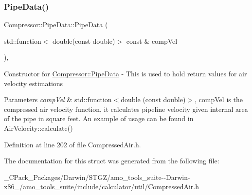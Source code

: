 \mbox{\label{struct_compressor_1_1_pipe_data_af7998fd533340b0a84e78fcda91b4806}} 
\subsubsection{\texorpdfstring{Pipe\+Data()}{PipeData()}\hspace{0.1cm}{\footnotesize\ttfamily [6/6]}}
{\footnotesize\ttfamily Compressor\+::\+Pipe\+Data\+::\+Pipe\+Data (\begin{DoxyParamCaption}\item[{std\+::function$<$ double(const double)$>$ const \&}]{comp\+Vel }\end{DoxyParamCaption})\hspace{0.3cm}{\ttfamily [inline]}, {\ttfamily [explicit]}}

Constructor for \hyperlink{struct_compressor_1_1_pipe_data}{Compressor\+::\+Pipe\+Data} -\/ This is used to hold return values for air velocity estimations 
\begin{DoxyParams}{Parameters}
{\em comp\+Vel} & std\+::function$<$double (const double)$>$, comp\+Vel is the compressed air velocity function, it calculates pipeline velocity given internal area of the pipe in square feet. An example of usage can be found in Air\+Velocity\+::calculate() \\
\hline
\end{DoxyParams}


Definition at line 202 of file Compressed\+Air.\+h.



The documentation for this struct was generated from the following file\+:\begin{DoxyCompactItemize}
\item 
\+\_\+\+C\+Pack\+\_\+\+Packages/\+Darwin/\+S\+T\+G\+Z/amo\+\_\+tools\+\_\+suite-\/-\/\+Darwin-\/x86\+\_/amo\+\_\+tools\+\_\+suite/include/calculator/util/Compressed\+Air.\+h\end{DoxyCompactItemize}
